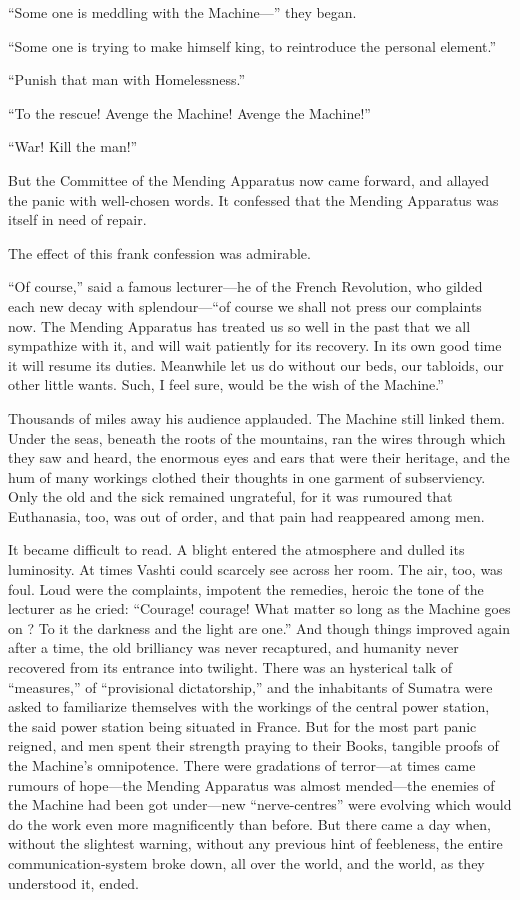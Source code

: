 ``Some one is meddling with the Machine---'' they began. %

``Some one is trying to make himself king, to reintroduce the personal element.''

``Punish that man with Homelessness.''

``To the rescue! Avenge the Machine! Avenge the Machine!''

``War! Kill the man!''

But the Committee of the Mending Apparatus now came forward, and allayed the panic with well-chosen words. It confessed that the Mending Apparatus was itself in need of repair.

The effect of this frank confession was admirable.

``Of course,'' said a famous lecturer---he of the French Revolution, who gilded each new decay with splendour---``of course we shall not press our complaints now. The Mending Apparatus has treated us so well in the past that we all sympathize with it, and will wait patiently for its recovery. In its own good time it will resume its duties. Meanwhile let us do without our beds, our tabloids, our other little wants. Such, I feel sure, would be the wish of the Machine.''

Thousands of miles away his audience applauded. The Machine still linked them. Under the seas, beneath the roots of the mountains, ran the wires through which they saw and heard, the enormous eyes and ears that were their heritage, and the hum of many workings clothed their thoughts in one garment of subserviency. Only the old and the sick remained ungrateful, for it was rumoured that Euthanasia, too, was out of order, and that pain had reappeared among men.

It became difficult to read. A blight entered the atmosphere and dulled its luminosity. At times Vashti could scarcely see across her room. The air, too, was foul. Loud were the complaints, impotent the remedies, heroic the tone of the lecturer as he cried: ``Courage! courage! What matter so long as the Machine goes on ? To it the darkness and the light are one.'' And though things improved again after a time, the old brilliancy was never recaptured, and humanity never recovered from its entrance into twilight. There was an hysterical talk of ``measures,'' of ``provisional dictatorship,'' and the inhabitants of Sumatra were asked to familiarize themselves with the workings of the central power station, the said power station being situated in France. But for the most part panic reigned, and men spent their strength praying to their Books, tangible proofs of the Machine's omnipotence. There were gradations of terror---at times came rumours of hope---the Mending Apparatus was almost mended---the enemies of the Machine had been got under---new ``nerve-centres'' were evolving which would do the work even more magnificently than before. But there came a day when, without the slightest warning, without any previous hint of feebleness, the entire communication-system broke down, all over the world, and the world, as they understood it, ended.

